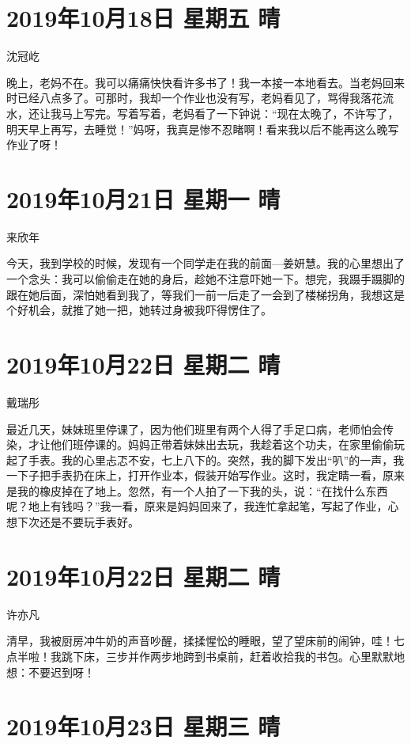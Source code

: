 \section{2019年10月18日 星期五 晴}

沈冠屹

晚上，老妈不在。我可以痛痛快快看许多书了！我一本接一本地看去。当老妈回来时已经八点多了。可那时，我却一个作业也没有写，老妈看见了，骂得我落花流水，还让我马上写完。写着写着，老妈看了一下钟说：``现在太晚了，不许写了，明天早上再写，去睡觉！''妈呀，我真是惨不忍睹啊！看来我以后不能再这么晚写作业了呀！

\section{2019年10月21日 星期一 晴}

来欣年

今天，我到学校的时候，发现有一个同学走在我的前面---姜妍慧。我的心里想出了一个念头：我可以偷偷走在她的身后，趁她不注意吓她一下。想完，我蹑手蹑脚的跟在她后面，深怕她看到我了，等我们一前一后走了一会到了楼梯拐角，我想这是个好机会，就推了她一把，她转过身被我吓得愣住了。

\section{2019年10月22日 星期二 晴}

戴瑞彤

最近几天，妹妹班里停课了，因为他们班里有两个人得了手足口病，老师怕会传染，才让他们班停课的。妈妈正带着妹妹出去玩，我趁着这个功夫，在家里偷偷玩起了手表。我的心里忐忑不安，七上八下的。突然，我的脚下发出``叭''的一声，我一下子把手表扔在床上，打开作业本，假装开始写作业。这时，我定睛一看，原来是我的橡皮掉在了地上。忽然，有一个人拍了一下我的头，说：``在找什么东西呢？地上有钱吗？''我一看，原来是妈妈回来了，我连忙拿起笔，写起了作业，心想下次还是不要玩手表好。

\section{2019年10月22日 星期二 晴}

许亦凡

清早，我被厨房冲牛奶的声音吵醒，揉揉惺忪的睡眼，望了望床前的闹钟，哇！七点半啦！我跳下床，三步并作两步地跨到书桌前，赶着收拾我的书包。心里默默地想：不要迟到呀！

\section{2019年10月23日 星期三 晴}

